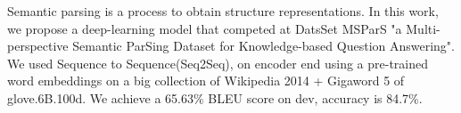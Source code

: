 Semantic parsing is a process to obtain structure representations. In this work, we propose a deep-learning model that competed at DatsSet MSParS "a Multi-perspective Semantic ParSing Dataset for Knowledge-based Question Answering". We used Sequence to Sequence(Seq2Seq), on encoder end using a pre-trained word embeddings on a big collection of Wikipedia 2014 + Gigaword 5 of glove.6B.100d.  We achieve a 65.63\% BLEU score on dev,  accuracy is 84.7\%.
